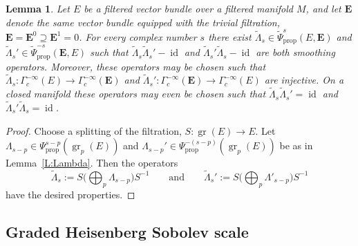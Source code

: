\documentclass[reqno,12pt]{amsart}
\DeclareMathOperator{\gr}{gr}
\DeclareMathOperator{\id}{id}
\newcommand\prop{\textrm{prop}}
\theoremstyle{plain}
\newtheorem{lemma}[theorem]{Lemma}
\theoremstyle{definition}
\begin{document}
\begin{lemma}\label{L:grLambda}
Let $E$ be a filtered vector bundle over a filtered manifold $M$, and let $\mathbf E$ denote the same vector bundle equipped with the trivial filtration, $\mathbf E=\mathbf E^0\supseteq\mathbf E^1=0$.
For every complex number $s$ there exist $\tilde\Lambda_s\in\tilde\Psi_\prop^s(E,\mathbf E)$ and $\tilde\Lambda_s'\in\tilde\Psi^{-s}_\prop(\mathbf E,E)$ such that $\tilde\Lambda_s\tilde\Lambda_s'-\id$ and $\tilde\Lambda_s'\tilde\Lambda_s-\id$ are both smoothing operators.
Moreover, these operators may be chosen such that $\tilde\Lambda_s\colon\Gamma^{-\infty}_c(E)\to\Gamma^{-\infty}_c(\mathbf E)$ and $\tilde\Lambda_s'\colon\Gamma^{-\infty}_c(\mathbf E)\to\Gamma^{-\infty}_c(E)$ are injective.
On a closed manifold these operators may even be chosen such that $\tilde\Lambda_s\tilde\Lambda_s'=\id$ and $\tilde\Lambda_s'\tilde\Lambda_s=\id$.
\end{lemma}


\begin{proof}
Choose a splitting of the filtration, $S\colon\gr(E)\to E$.
Let $\Lambda_{s-p}\in\Psi^{s-p}_\prop(\gr_p(E))$ and $\Lambda_{s-p}'\in\Psi^{-(s-p)}_\prop(\gr_p(E))$ be as in Lemma~\ref{L:Lambda}.
Then the operators
$$
\tilde\Lambda_s:=S\bigl(\textstyle\bigoplus_p\Lambda_{s-p}\bigr)S^{-1}
\qquad\text{and}\qquad
\tilde\Lambda_s':=S\bigl(\textstyle\bigoplus_p\Lambda'_{s-p}\bigr)S^{-1}
$$
have the desired properties.
\end{proof}





\subsection{Graded Heisenberg Sobolev scale}\label{SS:grsobolev}
\end{document}
